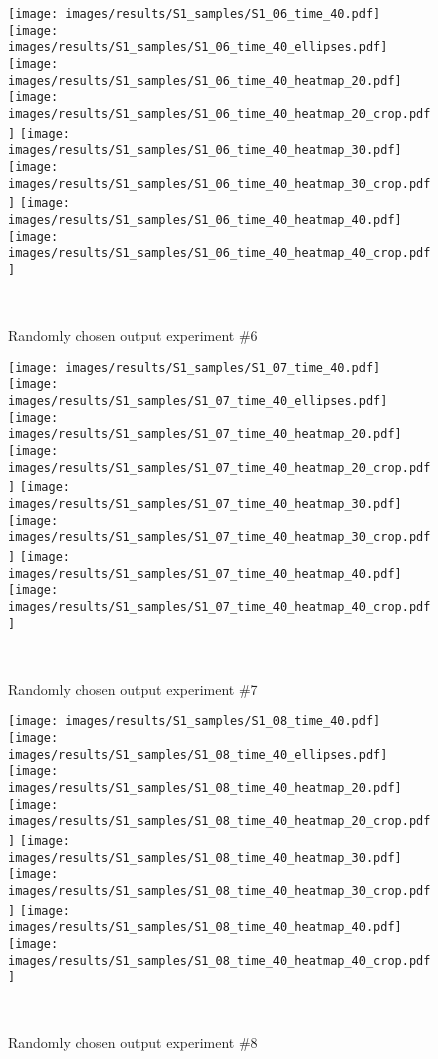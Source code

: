 \begin{figure*}[h]
\centering
\begin{minipage}[t]{\linewidth}
\texttt{[image: images/results/S1\_samples/S1\_06\_time\_40.pdf]}
\texttt{[image: images/results/S1\_samples/S1\_06\_time\_40\_ellipses.pdf]}
\texttt{[image: images/results/S1\_samples/S1\_06\_time\_40\_heatmap\_20.pdf]}
\texttt{[image: images/results/S1\_samples/S1\_06\_time\_40\_heatmap\_20\_crop.pdf]}
\texttt{[image: images/results/S1\_samples/S1\_06\_time\_40\_heatmap\_30.pdf]}
\texttt{[image: images/results/S1\_samples/S1\_06\_time\_40\_heatmap\_30\_crop.pdf]}
\texttt{[image: images/results/S1\_samples/S1\_06\_time\_40\_heatmap\_40.pdf]}
\texttt{[image: images/results/S1\_samples/S1\_06\_time\_40\_heatmap\_40\_crop.pdf]}
\end{minipage}\\
\caption{Randomly chosen output experiment \#6}
\end{figure*}
\begin{figure*}[h]
\centering
\begin{minipage}[t]{\linewidth}
\texttt{[image: images/results/S1\_samples/S1\_07\_time\_40.pdf]}
\texttt{[image: images/results/S1\_samples/S1\_07\_time\_40\_ellipses.pdf]}
\texttt{[image: images/results/S1\_samples/S1\_07\_time\_40\_heatmap\_20.pdf]}
\texttt{[image: images/results/S1\_samples/S1\_07\_time\_40\_heatmap\_20\_crop.pdf]}
\texttt{[image: images/results/S1\_samples/S1\_07\_time\_40\_heatmap\_30.pdf]}
\texttt{[image: images/results/S1\_samples/S1\_07\_time\_40\_heatmap\_30\_crop.pdf]}
\texttt{[image: images/results/S1\_samples/S1\_07\_time\_40\_heatmap\_40.pdf]}
\texttt{[image: images/results/S1\_samples/S1\_07\_time\_40\_heatmap\_40\_crop.pdf]}
\end{minipage}\\
\caption{Randomly chosen output experiment \#7}
\end{figure*}
\begin{figure*}[h]
\centering
\begin{minipage}[t]{\linewidth}
\texttt{[image: images/results/S1\_samples/S1\_08\_time\_40.pdf]}
\texttt{[image: images/results/S1\_samples/S1\_08\_time\_40\_ellipses.pdf]}
\texttt{[image: images/results/S1\_samples/S1\_08\_time\_40\_heatmap\_20.pdf]}
\texttt{[image: images/results/S1\_samples/S1\_08\_time\_40\_heatmap\_20\_crop.pdf]}
\texttt{[image: images/results/S1\_samples/S1\_08\_time\_40\_heatmap\_30.pdf]}
\texttt{[image: images/results/S1\_samples/S1\_08\_time\_40\_heatmap\_30\_crop.pdf]}
\texttt{[image: images/results/S1\_samples/S1\_08\_time\_40\_heatmap\_40.pdf]}
\texttt{[image: images/results/S1\_samples/S1\_08\_time\_40\_heatmap\_40\_crop.pdf]}
\end{minipage}\\
\caption{Randomly chosen output experiment \#8}
\end{figure*}
